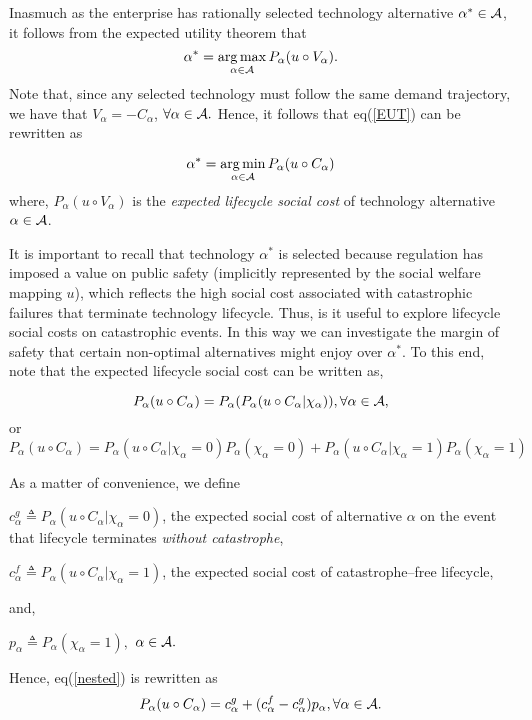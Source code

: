 \documentclass[12pt]{article}
\DeclareMathOperator*{\argmax}{arg\,max}
\DeclareMathOperator*{\argmin}{arg\,min}
\begin{document}
 \noindent
 Inasmuch as the enterprise has rationally selected technology alternative $\alpha^* \in {\cal{A}}$, it follows from the expected utility theorem that 
 \begin{equation}\label{EUT}
 \alpha^* = \argmax_{\alpha \in {\cal{A}}} P_\alpha(u \circ V_\alpha).
 \end{equation}
Note that, since %
any selected technology must follow the same demand trajectory, we have that $V_\alpha = -C_\alpha$,  $\forall \alpha \in {\cal{A}}.$  Hence, it follows that eq(\ref{EUT}) can be rewritten as 

$$\alpha^* = \argmin_{\alpha \in {\cal{A}}} P_\alpha(u \circ C_\alpha)$$
where, $P_\alpha(u \circ V_\alpha)$ is the \emph{expected lifecycle social cost} of technology alternative $\alpha \in {\cal{A}}$.


It is important to recall that technology $\alpha^*$ is selected because regulation has imposed a value on public safety (implicitly represented by the social welfare mapping $u$), which reflects the high social cost associated with catastrophic failures that terminate technology lifecycle. Thus, is it useful to explore lifecycle social costs on catastrophic events. In this way we can investigate the margin of safety that certain non-optimal alternatives might enjoy over  $\alpha^*$.  To this end, note that the expected lifecycle social cost can be written as, 

$$P_\alpha(u \circ C_\alpha) = P_\alpha(P_\alpha(u \circ C_\alpha | \chi_\alpha)), \forall \alpha \in {\cal{A}},$$
 or
 \begin{equation} \label{nested}
 P_\alpha(u \circ C_\alpha) = P_\alpha(u \circ C_\alpha | \chi_\alpha = 0)P_\alpha(\chi_\alpha = 0) + P_\alpha(u \circ C_\alpha | \chi_\alpha = 1)P_\alpha(\chi_\alpha = 1)
\end{equation}

\noindent
As a matter of convenience, we define 

$c_\alpha^g \triangleq P_\alpha(u \circ C_\alpha | \chi_\alpha = 0)$, the expected social cost of alternative $\alpha$ on the event that lifecycle terminates \emph{without catastrophe},

$c_\alpha^f \triangleq P_\alpha(u \circ C_\alpha | \chi_\alpha = 1)$, the expected social cost of catastrophe--free lifecycle, 

\noindent
and,

$p_\alpha \triangleq P_\alpha(\chi_\alpha = 1),$ $\alpha \in {\cal{A}}.$

\noindent
Hence, eq(\ref{nested}) is rewritten as
 \begin{equation} \label{fundamental}
 P_\alpha(u \circ C_\alpha) = c_\alpha^g  + (c_\alpha^f - c_\alpha^g)p_\alpha ,  \forall \alpha \in {\cal{A}}. 
 \end{equation}
\end{document}

